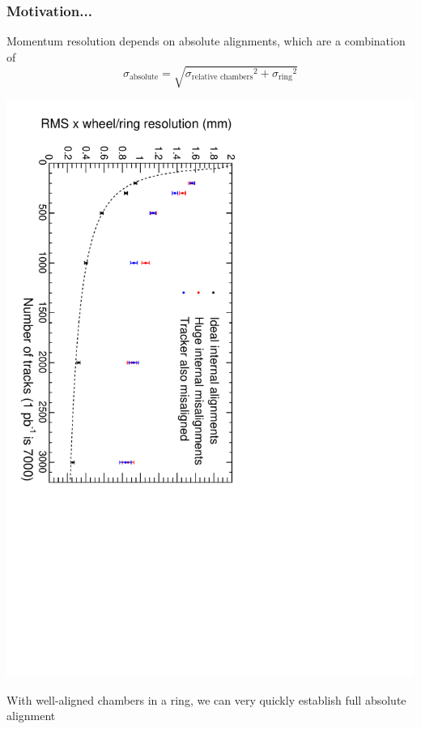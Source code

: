 \documentclass[compress]{beamer}
\begin{document}
\begin{frame}
\frametitle{Motivation...}

Momentum resolution depends on absolute alignments, which are a combination of
\[ \sigma_{\mbox{absolute}} = \sqrt{{\sigma_{\mbox{relative chambers}}}^2 + {\sigma_{\mbox{ring}}}^2} \]

\begin{center}
\includegraphics[height=0.9\linewidth, angle=90]{vsntracks.pdf}
\end{center}

With well-aligned chambers in a ring, we can very quickly establish full absolute alignment
\end{frame}
\end{document}
